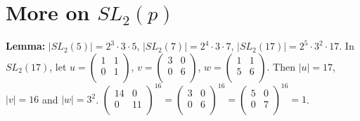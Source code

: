 \section {More on $SL_2(p)$}
{\bf Lemma:}
$|SL_2(5)|= 2^3 \cdot 3 \cdot 5$,
$|SL_2(7)|= 2^4 \cdot 3 \cdot 7$,
$|SL_2(17)|= 2^5 \cdot 3^2 \cdot 17$.  In $SL_2(17)$, let
$u= \left(
\begin{array}{cc}
1 &  1 \\
0 &  1\\
\end{array}
\right)$,
$v= \left(
\begin{array}{cc}
3 &  0 \\
0 &  6\\
\end{array}
\right)$,
$w= \left(
\begin{array}{cc}
1 &  1 \\
5 &  6\\
\end{array}
\right)$. Then $|u|=17$, $|v|=16$ and $|w|= 3^2$.
$
\left(
\begin{array}{cc}
14 &  0 \\
0 &  11\\
\end{array}
\right)^{16} =
\left(
\begin{array}{cc}
3 &  0 \\
0 &  6\\
\end{array}
\right)^{16} =
\left(
\begin{array}{cc}
5 &  0 \\
0 &  7\\
\end{array}
\right)^{16} = 1$.
